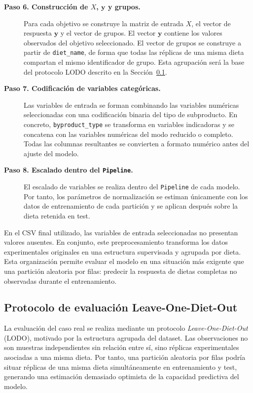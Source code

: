 \begin{description}
    \item[\textbf{Paso 6. Construcción de \(X\), \(\bm{y}\) y grupos.}]
    Para cada objetivo se construye la matriz de entrada \(X\), el vector de respuesta \(\bm{y}\) y el vector de grupos. El vector \(\bm{y}\) contiene los valores observados del objetivo seleccionado. El vector de grupos se construye a partir de \texttt{diet\_name}, de forma que todas las réplicas de una misma dieta compartan el mismo identificador de grupo. Esta agrupación será la base del protocolo LODO descrito en la Sección~\ref{subsec:lodo_caso_real}.

    \item[\textbf{Paso 7. Codificación de variables categóricas.}]
    Las variables de entrada se forman combinando las variables numéricas seleccionadas con una codificación binaria del tipo de subproducto. En concreto, \texttt{byproduct\_type} se transforma en variables indicadoras y se concatena con las variables numéricas del modo reducido o completo. Todas las columnas resultantes se convierten a formato numérico antes del ajuste del modelo.

    \item[\textbf{Paso 8. Escalado dentro del \texttt{Pipeline}.}]
    El escalado de variables se realiza dentro del \texttt{Pipeline} de cada modelo. Por tanto, los parámetros de normalización se estiman únicamente con los datos de entrenamiento de cada partición y se aplican después sobre la dieta retenida en test.
\end{description}

En el CSV final utilizado, las variables de entrada seleccionadas no presentan valores ausentes. En conjunto, este preprocesamiento transforma los datos experimentales originales en una estructura supervisada y agrupada por dieta. Esta organización permite evaluar el modelo en una situación más exigente que una partición aleatoria por filas: predecir la respuesta de dietas completas no observadas durante el entrenamiento.


\subsection{Protocolo de evaluación Leave-One-Diet-Out}
\label{subsec:lodo_caso_real}

La evaluación del caso real se realiza mediante un protocolo \emph{Leave-One-Diet-Out} (LODO), motivado por la estructura agrupada del dataset. Las observaciones no son muestras independientes sin relación entre sí, sino réplicas experimentales asociadas a una misma dieta. Por tanto, una partición aleatoria por filas podría situar réplicas de una misma dieta simultáneamente en entrenamiento y test, generando una estimación demasiado optimista de la capacidad predictiva del modelo. 

